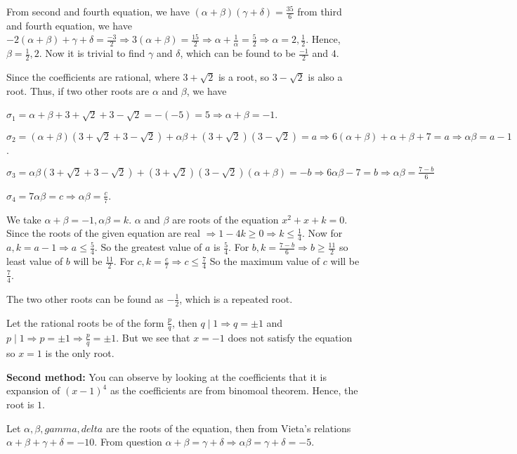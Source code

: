   From second and fourth equation, we have $(\alpha + \beta)(\gamma + \delta) = \frac{35}{6}$ from third and
  fourth equation, we have $-2(\alpha + \beta) + \gamma + \delta = \frac{-3}{2} \Rightarrow 3(\alpha +
  \beta) = \frac{15}{2} \Rightarrow \alpha + \frac{1}{\alpha} = \frac{5}{2}\Rightarrow \alpha = 2,
  \frac{1}{2}$. Hence, $\beta = \frac{1}{2}, 2$. Now it is trivial to find $\gamma$ and $\delta$, which can
  be found to be $\frac{-1}{2}$ and $4$.
\item Since the coefficients are rational, where $3 + \sqrt{2}$ is a root, so $3 - \sqrt{2}$ is also a
  root. Thus, if two other roots are $\alpha$ and $\beta$, we  have

  $\sigma_1 = \alpha + \beta + 3 + \sqrt{2} + 3 - \sqrt{2} = -(-5) = 5 \Rightarrow \alpha + \beta = -1$.

  $\sigma_2 = (\alpha + \beta)(3 + \sqrt{2} + 3 - \sqrt{2}) + \alpha\beta + (3 + \sqrt{2})(3 - \sqrt{2}) = a
  \Rightarrow 6(\alpha + \beta) + \alpha + \beta + 7 = a \Rightarrow \alpha\beta = a - 1$.

  $\sigma_3 = \alpha\beta(3 + \sqrt{2} + 3 - \sqrt{2}) + (3 + \sqrt{2})(3 - \sqrt{2})(\alpha + \beta) = -b
  \Rightarrow 6\alpha\beta - 7 = b\Rightarrow \alpha\beta = \frac{7 - b}{6}$

  $\sigma_4 = 7\alpha\beta = c \Rightarrow \alpha\beta = \frac{c}{7}$.

  We take $\alpha + \beta = -1, \alpha\beta = k$. $\alpha$ and $\beta$ are roots of the equation $x^2 + x +
  k= 0$. Since the roots of the given equation are real $\Rightarrow 1 - 4k\geq 0 \Rightarrow k\leq
  \frac{1}{4}$. Now for $a, k = a - 1\Rightarrow a\leq \frac{5}{4}$. So the greatest value of $a$ is
  $\frac{5}{4}$. For $b, k = \frac{7 - b}{6} \Rightarrow b\geq \frac{11}{2}$ so least value of $b$ will be
  $\frac{11}{2}$. For $c, k = \frac{c}{7} \Rightarrow c\leq \frac{7}{4}$ So the maximum value of $c$ will be
  $\frac{7}{4}$.

  The two other roots can be found as $-\frac{1}{2}$, which is a repeated root.
\item Let the rational roots be of the form $\frac{p}{q}$, then $q\mid 1 \Rightarrow q = \pm 1$ and $p\mid
  1\Rightarrow p = \pm 1 \Rightarrow \frac{p}{q} = \pm 1$. But we see that $x = -1$ does not satisfy the
  equation so $x = 1$ is the only root.

  {\bf Second method:} You can observe by looking at the coefficients that it is expansion of $(x - 1)^4$ as
  the coefficients are from binomoal theorem. Hence, the root is $1.$
\item Let $\alpha, \beta, gamma, delta$ are the roots of the equation, then from Vieta's relations $\alpha +
  \beta + \gamma + \delta = -10$. From question $\alpha + \beta = \gamma + \delta \Rightarrow \alpha \beta =
  \gamma + \delta = -5$.

